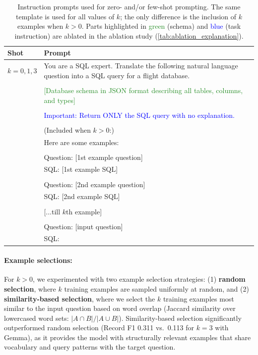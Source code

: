 \documentclass{article}
\begin{document}
\begin{table}[h!]
\centering
\begin{tabular}{p{1cm}p{12cm}}
\toprule
\textbf{Shot} & \textbf{Prompt} \\
\midrule
    $k{=}0,1,3$ & You are a SQL expert. Translate the following natural language question into a SQL query for a flight database. \\
    & \\
    & \textcolor{ForestGreen}{[Database schema in JSON format describing all tables, columns, and types]} \\
    & \\
    & \textcolor{Blue}{Important: Return ONLY the SQL query with no explanation.} \\
    & \\
    & (Included when $k > 0$:) \\
    & Here are some examples: \\
    & \\
    & Question: [1st example question] \\
    & SQL: [1st example SQL] \\
    & \\
    & Question: [2nd example question] \\
    & SQL: [2nd example SQL] \\
    & \\
    & {[}...till $k$th example{]} \\
    & \\
    & Question: [input question] \\
    & SQL: \\
\bottomrule
\end{tabular}
\caption{Instruction prompts used for zero- and/or few-shot prompting. The same template is used for all values of $k$; the only difference is the inclusion of $k$ examples when $k > 0$. Parts highlighted in \textcolor{ForestGreen}{green} (schema) and \textcolor{Blue}{blue} (task instruction) are ablated in the ablation study (\autoref{tab:ablation_explanation}).}
\label{tab:icl_prompts}
\end{table}


\paragraph{Example selections:} For $k > 0$, we experimented with two example selection strategies: (1) \textbf{random selection}, where $k$ training examples are sampled uniformly at random, and (2) \textbf{similarity-based selection}, where we select the $k$ training examples most similar to the input question based on word overlap (Jaccard similarity over lowercased word sets: $|A \cap B| / |A \cup B|$). Similarity-based selection significantly outperformed random selection (Record F1 0.311 vs.\ 0.113 for $k{=}3$ with Gemma), as it provides the model with structurally relevant examples that share vocabulary and query patterns with the target question.
\end{document}
